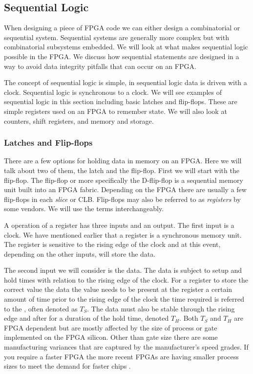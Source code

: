 \subsection{Sequential Logic}
	
When designing a piece of \ac{FPGA} code we can either design a combinatorial or sequential system. Sequential systems are generally more complex but with combinatorial subsystems embedded. We will look at what makes sequential logic possible in the \ac{FPGA}. We discuss how sequential statements are designed in a way to avoid data integrity pitfalls that can occur on an \ac{FPGA}.
	
The concept of sequential logic is simple, in sequential logic data is driven with a clock. Sequential logic is synchronous to a clock. We will see examples of sequential logic in this section including basic latches and flip-flops. These are simple registers used on an \ac{FPGA} to remember state. We will also look at counters, shift registers, and memory and storage. 	
	
	
\subsubsection{Latches and Flip-flops}
\label{sec:regs}
There are a few options for holding data in memory on an \ac{FPGA}. Here we will talk about two of them, the latch and the flip-flop. First we will start with the flip-flop. The flip-flop or more specifically the D-flip-flop is a sequential memory unit built into an \ac{FPGA} fabric. Depending on the \ac{FPGA} there are usually a few flip-flops in each \emph{slice} or \ac{CLB}. Flip-flops may also be referred to as \emph{registers} by some vendors. We will use the terms interchangeably. 

A operation of a register has three inputs and an output. The first input is a clock. We have mentioned earlier that a register is a synchronous memory unit. The register is sensitive to the rising edge of the clock and at this event, depending on the other inputs, will store the data. 

The second input we will consider is the data. The data is subject to setup and hold times with relation to the rising edge of the clock. For a register to store the correct value the data the value needs to be present at the register a certain amount of time prior to the rising edge of the clock the time required is referred to the \emph{}, often denoted as $T_S$. The data must also be stable through the rising edge and after for a duration of the hold time, denoted $T_H$. Both $T_S$ and $T_H$ are \ac{FPGA} dependent but are mostly affected by the size of process or gate implemented on the \ac{FPGA} silicon. Other than gate size there are some manufacturing variances that are captured by the manufacturer's speed grades. If you require a faster \ac{FPGA} the more recent \ac{FPGA}s are having smaller process sizes to meet the demand for faster chips \cite{7nmref}. 

